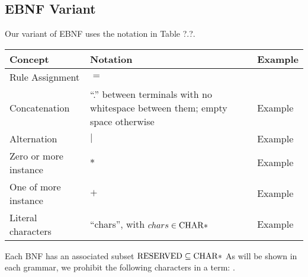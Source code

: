 \subsection{EBNF Variant}
Our variant of EBNF uses the notation in Table ?.?.
\begin{center}
\begin{tabular}{ | m{3cm} | m{5cm} | m{5cm} | }
	\hline
  Concept & Notation & Example \\
  \hline
	Rule Assignment & $=$ & \\
	Concatenation & ``.'' between terminals with no whitespace between them; empty space otherwise & Example \\
	Alternation & $|$ & Example \\
	Zero or more instance & $*$ & Example \\
	One of more instance & $+$ & Example \\
  Literal characters & ``chars'', with $chars \in \mathrm{CHAR}*$ & Example \\
  \hline
\end{tabular}
\end{center}
Each BNF has an associated subset $\mathrm{RESERVED} \subseteq \mathrm{CHAR}*$ As will be shown in each grammar, we prohibit the following characters in a term: .

